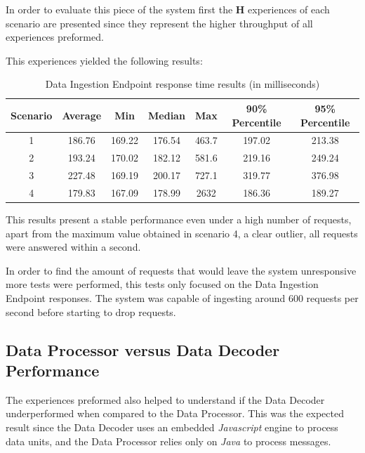 In order to evaluate this piece of the system first the \textbf{H} experiences of each scenario are presented since they represent the higher throughput of all experiences preformed.

This experiences yielded the following results:

\begin{table}[H]
    \caption{Data Ingestion Endpoint response time results (in milliseconds)}
    \label{tab:evaluation:overview:endpoint:results}
    \centering
    \begin{tabular}{@{}ccccccc@{}}
    \toprule
    \textbf{Scenario} & \textbf{Average} & \textbf{Min} & \textbf{Median} & \textbf{Max} & \textbf{90\% Percentile} & \textbf{95\% Percentile} \\ \midrule
    1 & 186.76 & 169.22 & 176.54 & 463.7 & 197.02 & 213.38 \\ \midrule
    2 & 193.24 & 170.02 & 182.12 & 581.6 & 219.16 & 249.24 \\ \midrule
    3 & 227.48 & 169.19 & 200.17 & 727.1 & 319.77 & 376.98 \\ \midrule
    4 & 179.83 & 167.09 & 178.99 & 2632 & 186.36 & 189.27 \\ \bottomrule
    \end{tabular}
\end{table}

This results present a stable performance even under a high number of requests, apart from the maximum value obtained in scenario 4, a clear outlier, all requests were answered within a second.

In order to find the amount of requests that would leave the system unresponsive more tests were performed, this tests only focused on the Data Ingestion Endpoint responses. The system was capable of ingesting around 600 requests per second before starting to drop requests.

\subsection{Data Processor versus Data Decoder Performance}
\label{subsec:evaluation:overview:decoproc}

The experiences preformed also helped to understand if the Data Decoder  underperformed when compared to the Data Processor. This was the expected result since the Data Decoder uses an embedded \textit{Javascript} engine to process data units, and the Data Processor relies only on \textit{Java} to process messages.

